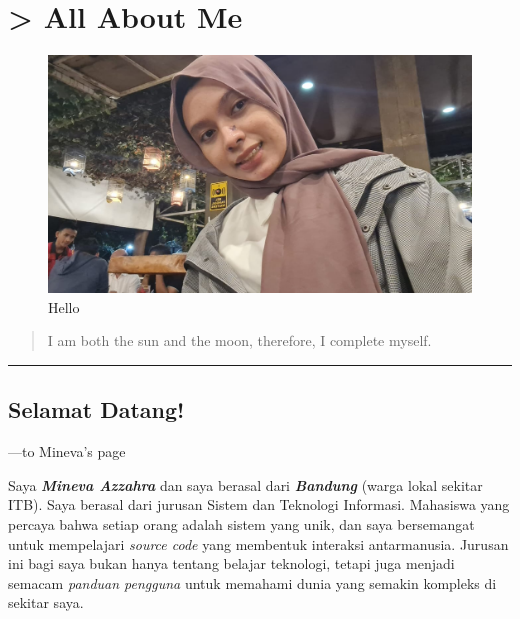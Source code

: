 \documentclass[
  letterpaper,
  DIV=11,
  numbers=noendperiod]{scrreprt}
\begin{document}

\chapter{\textgreater{} All About Me}\label{all-about-me}

\begin{figure}[H]

{\centering \includegraphics[width=1\linewidth,height=\textheight,keepaspectratio]{images/mi.jpeg}

}

\caption{Hello}

\end{figure}%

\begin{quote}
I am both the sun and the moon, therefore, I complete myself.
\end{quote}

\begin{center}\rule{0.5\linewidth}{0.5pt}\end{center}

\section{Selamat Datang!}\label{selamat-datang}

---to Mineva's page

Saya \textbf{\emph{Mineva Azzahra}} dan saya berasal dari
\textbf{\emph{Bandung}} (warga lokal sekitar ITB). Saya berasal dari
jurusan Sistem dan Teknologi Informasi. Mahasiswa yang percaya bahwa
setiap orang adalah sistem yang unik, dan saya bersemangat untuk
mempelajari \emph{source code} yang membentuk interaksi antarmanusia.
Jurusan ini bagi saya bukan hanya tentang belajar teknologi, tetapi juga
menjadi semacam \emph{panduan pengguna} untuk memahami dunia yang
semakin kompleks di sekitar saya.
\end{document}
